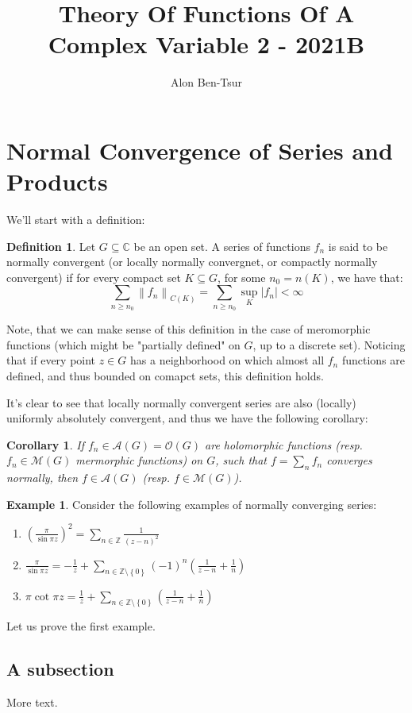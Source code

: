 \documentclass[11pt]{article} %
\title{Theory Of Functions Of A Complex Variable 2 - 2021B}
\author{Alon Ben-Tsur}
\newtheorem{corollary}[theorem]{Corollary}
\theoremstyle{definition}
\newtheorem{definition}[theorem]{Definition}
\newtheorem{example}[theorem]{Example}
\begin{document}
\maketitle

\section{Normal Convergence of Series and Products}

We'll start with a definition:

\begin{definition}
Let $G \subseteq \mathbb{C}$ be an open set. A series of functions $f_n$ is said to be normally convergent (or locally normally convergnet, or compactly normally convergent) if for every compact set $K \subseteq G$, for some $n_0 = n\left(K\right)$, we have that:
\[ \sum _{n \geq n_0} \left\lVert f_n \right\rVert_{C\left(K\right)} = \sum _{n \geq n_0} \sup _K \left|f_n\right| < \infty \]
\end{definition}

Note, that we can make sense of this definition in the case of meromorphic functions (which might be "partially defined" on $G$, up to a discrete set). Noticing that if every point $z \in G$ has a neighborhood on which almost all $f_n$ functions are defined, and thus bounded on comapct sets, this definition holds.

It's clear to see that locally normally convergent series are also (locally) uniformly absolutely convergent, and thus we have the following corollary:

\begin{corollary}
If $f_n \in \mathcal{A}\left(G\right) = \mathcal{O}\left(G\right)$ are holomorphic functions (resp. $f_n \in \mathcal{M}\left(G\right)$ mermorphic functions) on $G$, such that $f = \sum_n f_n$ converges normally, then $f \in \mathcal{A}\left(G\right)$ (resp. $f \in \mathcal{M}\left(G\right)$).
\end{corollary}

\begin{example}
Consider the following examples of normally converging series:

\begin{enumerate}
\item $\left(\frac{\pi}{\sin\pi z}\right)^2 = \sum_{n\in\mathbb{Z}} \frac{1}{\left(z-n\right)^2}$
\item $\frac{\pi}{\sin\pi z}= -\frac{1}{z} + \sum_{n\in\mathbb{Z}\setminus\left\{0\right\}}\left(-1\right)^n \left(\frac{1}{z-n} + \frac{1}{n}\right)$
\item $\pi \cot \pi z =  \frac{1}{z} + \sum_{n\in\mathbb{Z}\setminus\left\{0\right\}} \left(\frac{1}{z-n} + \frac{1}{n}\right)$
\end{enumerate}
\end{example}

Let us prove the first example.

\subsection{A subsection}

More text.
\end{document}
